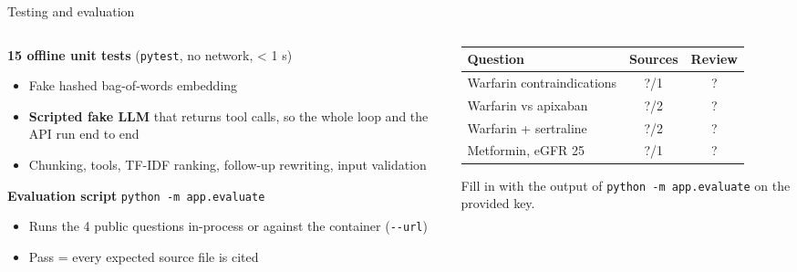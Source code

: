 \documentclass[aspectratio=169,11pt]{beamer}
\begin{document}
\begin{frame}{Testing and evaluation}
  \begin{columns}[T]
    \begin{column}{0.48\textwidth}
      \small
      \textbf{15 offline unit tests} (\texttt{pytest}, no network, < 1 s)
      \begin{itemize}
        \item Fake hashed bag-of-words embedding
        \item \textbf{Scripted fake LLM} that returns tool calls, so the whole loop and the API run end to end
        \item Chunking, tools, TF-IDF ranking, follow-up rewriting, input validation
      \end{itemize}
      \vspace{0.3em}
      \textbf{Evaluation script} \texttt{python -m app.evaluate}
      \begin{itemize}
        \item Runs the 4 public questions in-process or against the container (\texttt{-{}-url})
        \item Pass = every expected source file is cited
      \end{itemize}
    \end{column}
    \begin{column}{0.49\textwidth}
      \small
      \renewcommand{\arraystretch}{1.2}
      \begin{tabularx}{\textwidth}{@{}X c c@{}}
        \toprule
        \textbf{Question} & \textbf{Sources} & \textbf{Review} \\
        \midrule
        Warfarin contra\-indications & ?/1 & ? \\
        Warfarin vs apixaban & ?/2 & ? \\
        Warfarin + sertraline & ?/2 & ? \\
        Metformin, eGFR 25 & ?/1 & ? \\
        \bottomrule
      \end{tabularx}
      \vspace{0.3em}

      {\color{warnorange}\footnotesize Fill in with the output of \texttt{python -m app.evaluate} on the provided key.}
    \end{column}
  \end{columns}
\end{frame}
\end{document}
